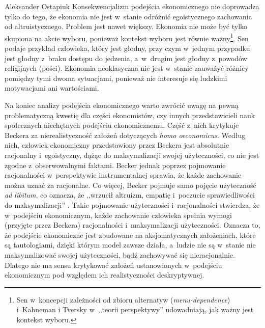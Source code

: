\begin{artplenv}{Aleksander Ostapiuk}
Konsekwencjalizm podejścia ekonomicznego nie doprowadza tylko do tego, że ekonomia nie jest w~stanie odróżnić
egoistycznego zachowania od altruistycznego. Problem jest nawet większy. Ekonomia nie może być tylko skupiona na akcie
wyboru, ponieważ kontekst wyboru jest równie ważny\footnote{%
Sen
\parencite*[s.~130]{sen_rationality_2002}
w~koncepcji
zależności od zbioru alternatyw
(\textit{menu-dependence}) i~Kahneman i Tversky
\parencite*{kahneman_prospect_1979}
w~,,teorii perspektywy'' udowadniają, jak
ważny jest kontekst wyboru.}. Sen
\parencite*[s.~75]{sen_development_1999}
podaje przykład człowieka, który jest głodny,
przy czym w~jednym przypadku jest głodny z~braku dostępu do jedzenia, a~w~drugim jest głodny z~powodów religijnych
(pości). Ekonomia neoklasyczna nie jest w~stanie zauważyć różnicy pomiędzy tymi dwoma sytuacjami, ponieważ nie
interesuje się ludzkimi motywacjami ani wartościami.

Na koniec analizy podejścia ekonomicznego warto zwrócić uwagę na pewną problematyczną kwestię dla części
ekonomistów, czy innych przedstawicieli nauk społecznych niechętnych podejściu ekonomicznemu. Część z~nich
krytykuje Beckera za nierealistyczność założeń dotyczących \textit{homo oeconomicus}. Według nich, człowiek ekonomiczny
przedstawiony przez Beckera jest absolutnie racjonalny i~egoistyczny, dążąc do maksymalizacji swojej użyteczności, co
nie jest zgodne z~obserwowalnymi faktami. Becker jednak poprzez pojmowanie racjonalności w~perspektywie instrumentalnej
sprawia, że każde zachowanie można uznać za racjonalne. Co więcej, Becker pojmuje samo pojęcie użyteczność \textit{ad
libitum}, co oznacza, że ,,wrzucił altruizm, empatię i~poczucie sprawiedliwości do \guillemotright maksymalizacji''
\parencite[s.~74–75]{ostapiuk_moralna_2017}.
Takie pojmowanie użyteczności i~racjonalności stwierdza,
że w~podejściu ekonomicznym, każde zachowanie człowieka spełnia wymogi (przyjęte przez Beckera)
racjonalności i~maksymalizacji użyteczności. Oznacza to, że podejście ekonomiczne jest zbudowane na aksjomatycznych założeniach, które
są tautologiami, dzięki którym model zawsze działa, a~ludzie nie są w~stanie nie maksymalizować swojej użyteczności,
bądź zachowywać się nieracjonalnie. Dlatego nie ma sensu krytykować założeń ustanowionych w~podejściu
ekonomicznym pod względem ich realistyczności deskryptywnej. 


\end{artplenv}
